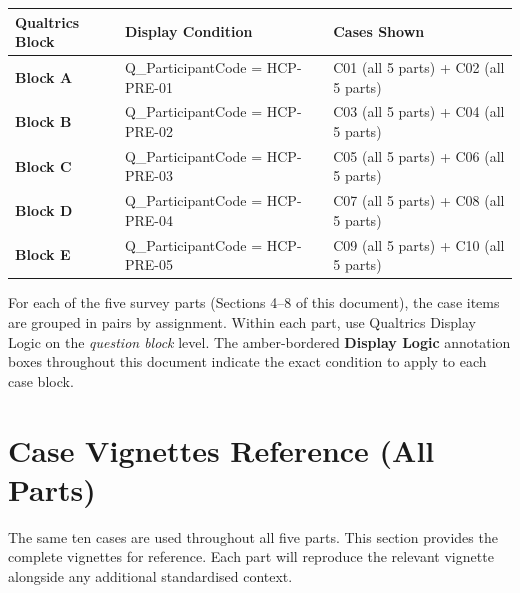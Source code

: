 \documentclass[11pt,a4paper]{article}
\renewcommand{\arraystretch}{1.30}
\begin{document}
\begin{center}
\small\renewcommand{\arraystretch}{1.35}
\begin{tabular}{@{}>{\bfseries\color{TealGreen}}p{}p{}p{}@{}}
\toprule
\textbf{Qualtrics Block} & \textbf{Display Condition} & \textbf{Cases Shown} \\
\midrule
Block A & Q\_ParticipantCode = HCP-PRE-01 & C01 (all 5 parts) + C02 (all 5 parts) \\
Block B & Q\_ParticipantCode = HCP-PRE-02 & C03 (all 5 parts) + C04 (all 5 parts) \\
Block C & Q\_ParticipantCode = HCP-PRE-03 & C05 (all 5 parts) + C06 (all 5 parts) \\
Block D & Q\_ParticipantCode = HCP-PRE-04 & C07 (all 5 parts) + C08 (all 5 parts) \\
Block E & Q\_ParticipantCode = HCP-PRE-05 & C09 (all 5 parts) + C10 (all 5 parts) \\
\bottomrule
\end{tabular}
\end{center}

\vspace{0.3em}
\begin{instrbox}[title=Note for Qualtrics configurator]
\small For each of the five survey parts (Sections 4--8 of this document), the case items are grouped in pairs by assignment. Within each part, use Qualtrics Display Logic on the \emph{question block} level. The amber-bordered \textbf{Display Logic} annotation boxes throughout this document indicate the exact condition to apply to each case block.
\end{instrbox}


\section{Case Vignettes Reference (All Parts)}

The same ten cases are used throughout all five parts. This section provides the complete vignettes for reference. Each part will reproduce the relevant vignette alongside any additional standardised context.
\end{document}
